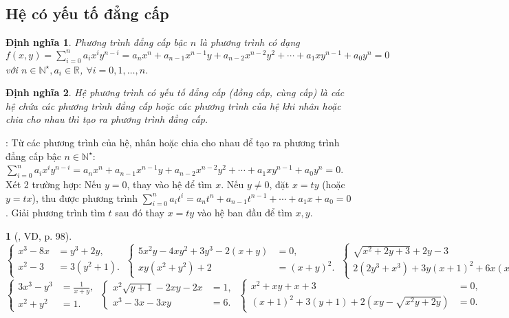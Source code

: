 \documentclass{article}
\newtheorem{baitoan}{}
\newtheorem{dinhnghia}{Định nghĩa}
\begin{document}
\subsection{Hệ có yếu tố đẳng cấp}

\begin{dinhnghia}
	{\rm Phương trình đẳng cấp bậc $n$} là phương trình có dạng $f(x,y) = \sum_{i=0}^n a_ix^iy^{n-i} = a_nx^n + a_{n-1}x^{n-1}y + a_{n-2}x^{n-2}y^2 + \cdots + a_1xy^{n-1} + a_0y^n = 0$ với $n\in\mathbb{N}^\star,a_i\in\mathbb{R}$, $\forall i = 0,1,\ldots,n$.
\end{dinhnghia}

\begin{dinhnghia}
	{\rm Hệ phương trình có yếu tố đẳng cấp} (đồng cấp, cùng cấp) là các hệ chứa các phương trình đẳng cấp hoặc các phương trình của hệ khi nhân hoặc chia cho nhau thì tạo ra phương trình đẳng cấp.
\end{dinhnghia}
: Từ các phương trình của hệ, nhân hoặc chia cho nhau để tạo ra phương trình đẳng cấp bậc $n\in\mathbb{N}^\star$: $\sum_{i=0}^n a_ix^iy^{n-i} = a_nx^n + a_{n-1}x^{n-1}y + a_{n-2}x^{n-2}y^2 + \cdots + a_1xy^{n-1} + a_0y^n = 0$. Xét 2 trường hợp: Nếu $y = 0$, thay vào hệ để tìm $x$. Nếu $y\ne0$, đặt $x = ty$ (hoặc $y = tx$), thu được phương trình $\sum_{i=0}^n a_it^i = a_nt^n + a_{n-1}t^{n-1} + \cdots + a_1x + a_0 = 0$. Giải phương trình tìm $t$ sau đó thay $x = ty$ vào hệ ban đầu để tìm $x,y$.

\begin{baitoan}[\cite{Kien_dai_so_9}, VD, p. 98]
	\begin{equation*}
		\left\{\begin{split}
			x^3 - 8x &= y^3 + 2y,\\
			x^2 - 3 &= 3(y^2 + 1).
		\end{split}\right.\ \left\{\begin{split}
			5x^2y - 4xy^2 + 3y^3 - 2(x + y) &= 0,\\
			xy(x^2 + y^2) + 2 &= (x + y)^2.
		\end{split}\right.\ \left\{\begin{split}
			\sqrt{x^2 + 2y + 3} + 2y - 3 &= 0,\\
			2(2y^3 + x^3) + 3y(x + 1)^2 + 6x(x + 1) + 2 &= 0.
		\end{split}\right.
	\end{equation*}
	\begin{equation*}
		\left\{\begin{split}
			3x^3 - y^3 &= \frac{1}{x + y},\\
			x^2 + y^2 &= 1.
		\end{split}\right.\ \left\{\begin{split}
			x^2\sqrt{y + 1} - 2xy - 2x &= 1,\\
			x^3 - 3x - 3xy &= 6.
		\end{split}\right.\ \left\{\begin{split}
			x^2 + xy + x + 3 &= 0,\\
			(x + 1)^2 + 3(y + 1) + 2(xy - \sqrt{x^2y + 2y}) &= 0.
		\end{split}\right.
	\end{equation*}
\end{baitoan}
\end{document}

